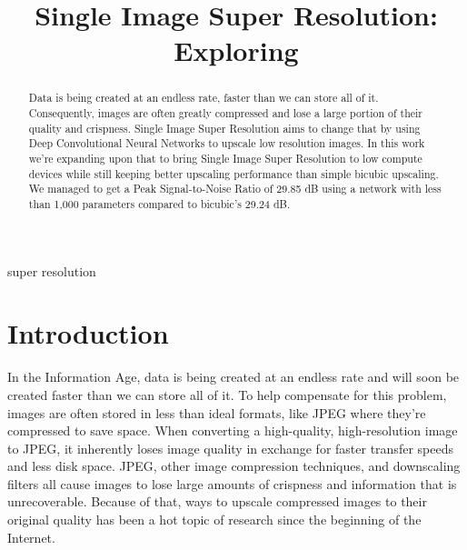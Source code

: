 \documentclass[conference]{IEEEtran}
\begin{document}
\title{Single Image Super Resolution: Exploring }

\author{
}

\maketitle

\begin{abstract}
  Data is being created at an endless rate, faster than we can store all of it.
  Consequently, images are often greatly compressed and lose a large portion of their quality and crispness.
  Single Image Super Resolution aims to change that by using Deep Convolutional Neural Networks to upscale low resolution images.
  In this work we're expanding upon that to bring Single Image Super Resolution to low compute devices while still keeping better upscaling performance than simple bicubic upscaling.
  We managed to get a Peak Signal-to-Noise Ratio of 29.85 dB using a network with less than 1,000 parameters compared to bicubic's 29.24 dB.
\end{abstract}

\begin{IEEEkeywords}
  super resolution
\end{IEEEkeywords}

\section{Introduction}

In the Information Age, data is being created at an endless rate and will soon be created faster than we can store all of it.
To help compensate for this problem, images are often stored in less than ideal formats, like JPEG where they're compressed to save space.
When converting a high-quality, high-resolution image to JPEG, it inherently loses image quality in exchange for faster transfer speeds and less disk space.
JPEG, other image compression techniques, and downscaling filters all cause images to lose large amounts of crispness and information that is unrecoverable.
Because of that, ways to upscale compressed images to their original quality has been a hot topic of research since the beginning of the Internet.
\end{document}
